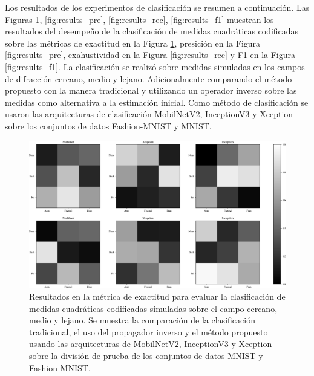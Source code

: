 Los resultados de los experimentos de clasificación se resumen a continuación. Las Figuras \ref{fig:results_acc}, \ref{fig:results_pre},  \ref{fig:results_rec}, \ref{fig:results_f1} muestran los resultados del desempeño de la clasificación de medidas cuadráticas codificadas sobre las métricas de exactitud en la Figura \ref{fig:results_acc}, presición en la Figura \ref{fig:results_pre}, exahustividad  en la Figura \ref{fig:results_rec} y F1 en la Figura \ref{fig:results_f1}. La clasificación se realizó sobre medidas simuladas en los campos de difracción cercano, medio y lejano. Adicionalmente comparando el método propuesto con la manera tradicional y utilizando un operador inverso sobre las medidas como alternativa a la estimación inicial. Como método de clasificación se usaron las arquitecturas de clasificación MobilNetV2, InceptionV3 y Xception sobre los conjuntos de datos Fashion-MNIST y MNIST.


\begin{figure}[!h]
    \centering
    \includegraphics[width=\linewidth]{images/test_result_acc.pdf}
    \caption{Resultados en la métrica de exactitud para evaluar la clasificación de medidas cuadráticas codificadas simuladas sobre el campo cercano, medio y lejano. Se muestra la comparación de la clasificación tradicional, el uso del propagador inverso y el método propuesto usando las arquitecturas de MobilNetV2, InceptionV3 y Xception sobre la división de prueba de los conjuntos de datos MNIST y Fashion-MNIST.}
    \label{fig:results_acc}
\end{figure}


